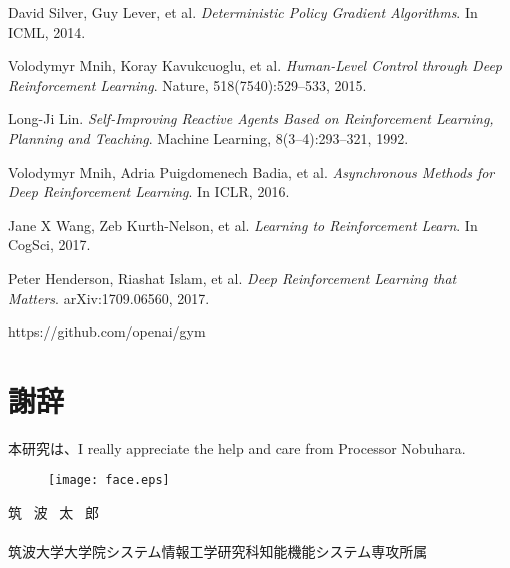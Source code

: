 \documentclass[11pt,twocolumn]{jarticle} %
\begin{document}
\begin{thebibliography}{9}
David Silver, Guy Lever, et al. \textsl{Deterministic Policy Gradient Algorithms}. In ICML, 2014.

Volodymyr Mnih, Koray Kavukcuoglu, et al. \textsl{Human-Level Control through Deep Reinforcement Learning}. Nature, 518(7540):529–533, 2015.

Long-Ji Lin. \textsl{Self-Improving Reactive Agents Based on Reinforcement Learning, Planning and Teaching}. Machine Learning, 8(3–4):293–321, 1992.

Volodymyr Mnih, Adria Puigdomenech Badia, et al. \textsl{Asynchronous Methods for Deep Reinforcement Learning}. In ICLR, 2016.

Jane X Wang, Zeb Kurth-Nelson, et al. \textsl{Learning to Reinforcement Learn}. In CogSci, 2017.

Peter Henderson, Riashat Islam, et al. \textsl{Deep Reinforcement Learning that Matters}. arXiv:1709.06560, 2017.

https://github.com/openai/gym

\section*{謝辞}
本研究は、I really appreciate the help and care from Processor Nobuhara.

\vspace{2zh}
\begin{minipage}{73mm}
 \begin{wrapfigure}[6]{l}[-4pt]{30mm} 
 \begin{center}
  \texttt{[image: face.eps]}
 \end{center}
 \end{wrapfigure}
 \noindent 筑 \ 波 \ 太 \  郎\\\\
 筑波大学大学院システム情報工学研究科知能機能システム専攻所属
\end{minipage}

\end{thebibliography}
\clearpage
\end{document}
